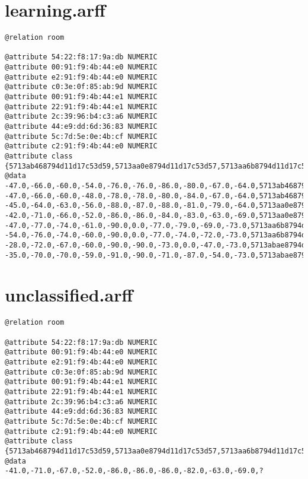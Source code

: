 \section{learning.arff}
\begin{lstlisting}
@relation room

@attribute 54:22:f8:17:9a:db NUMERIC
@attribute 00:91:f9:4b:44:e0 NUMERIC
@attribute e2:91:f9:4b:44:e0 NUMERIC
@attribute c0:3e:0f:85:ab:9d NUMERIC
@attribute 00:91:f9:4b:44:e1 NUMERIC
@attribute 22:91:f9:4b:44:e1 NUMERIC
@attribute 2c:39:96:b4:c3:a6 NUMERIC
@attribute 44:e9:dd:6d:36:83 NUMERIC
@attribute 5c:7d:5e:0e:4b:cf NUMERIC
@attribute c2:91:f9:4b:44:e0 NUMERIC
@attribute class {5713ab468794d11d17c53d59,5713aa0e8794d11d17c53d57,5713aa6b8794d11d17c53d58,5713abae8794d11d17c53d5a}
@data
-47.0,-66.0,-60.0,-54.0,-76.0,-76.0,-86.0,-80.0,-67.0,-64.0,5713ab468794d11d17c53d59
-47.0,-66.0,-60.0,-48.0,-78.0,-78.0,-80.0,-84.0,-67.0,-64.0,5713ab468794d11d17c53d59
-45.0,-64.0,-63.0,-56.0,-88.0,-87.0,-88.0,-81.0,-79.0,-64.0,5713aa0e8794d11d17c53d57
-42.0,-71.0,-66.0,-52.0,-86.0,-86.0,-84.0,-83.0,-63.0,-69.0,5713aa0e8794d11d17c53d57
-47.0,-77.0,-74.0,-61.0,-90.0,0.0,-77.0,-79.0,-69.0,-73.0,5713aa6b8794d11d17c53d58
-54.0,-76.0,-74.0,-60.0,-90.0,0.0,-77.0,-74.0,-72.0,-73.0,5713aa6b8794d11d17c53d58
-28.0,-72.0,-67.0,-60.0,-90.0,-90.0,-73.0,0.0,-47.0,-73.0,5713abae8794d11d17c53d5a
-35.0,-70.0,-70.0,-59.0,-91.0,-90.0,-71.0,-87.0,-54.0,-73.0,5713abae8794d11d17c53d5a

\end{lstlisting}
\newpage

\section{unclassified.arff}
\begin{lstlisting}
@relation room

@attribute 54:22:f8:17:9a:db NUMERIC
@attribute 00:91:f9:4b:44:e0 NUMERIC
@attribute e2:91:f9:4b:44:e0 NUMERIC
@attribute c0:3e:0f:85:ab:9d NUMERIC
@attribute 00:91:f9:4b:44:e1 NUMERIC
@attribute 22:91:f9:4b:44:e1 NUMERIC
@attribute 2c:39:96:b4:c3:a6 NUMERIC
@attribute 44:e9:dd:6d:36:83 NUMERIC
@attribute 5c:7d:5e:0e:4b:cf NUMERIC
@attribute c2:91:f9:4b:44:e0 NUMERIC
@attribute class {5713ab468794d11d17c53d59,5713aa0e8794d11d17c53d57,5713aa6b8794d11d17c53d58,5713abae8794d11d17c53d5a}
@data
-41.0,-71.0,-67.0,-52.0,-86.0,-86.0,-86.0,-82.0,-63.0,-69.0,?


\end{lstlisting}
\newpage

